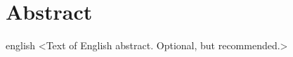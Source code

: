 \chapter*{Abstract}             %
\label{chap-abstract}           %

\begin{otherlanguage*}{english}
  <Text of English abstract. Optional, but recommended.>
\end{otherlanguage*}
